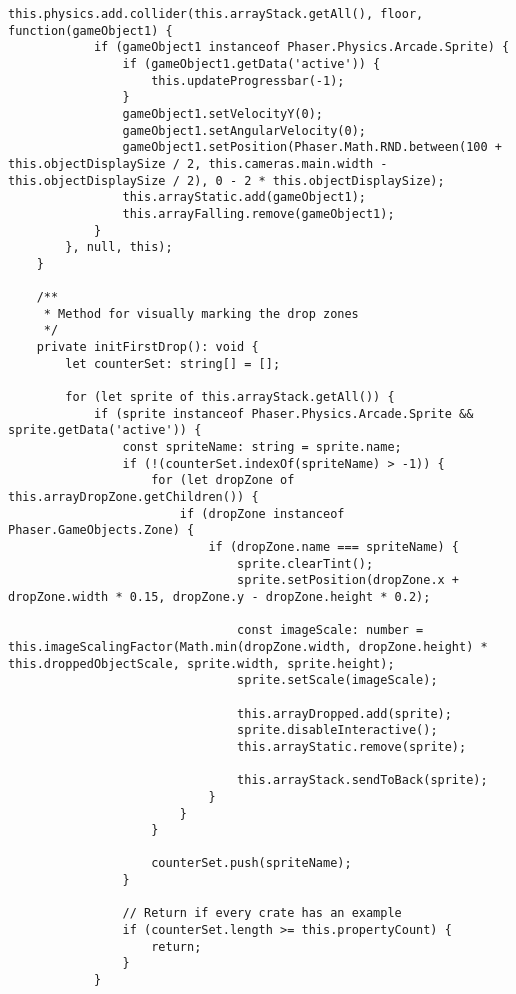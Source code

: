 \begin{lstlisting}[style=TypeScript, caption={propertySortingScene.ts}]
        this.physics.add.collider(this.arrayStack.getAll(), floor, function(gameObject1) {
            if (gameObject1 instanceof Phaser.Physics.Arcade.Sprite) {
                if (gameObject1.getData('active')) {
                    this.updateProgressbar(-1);
                }
                gameObject1.setVelocityY(0);
                gameObject1.setAngularVelocity(0);
                gameObject1.setPosition(Phaser.Math.RND.between(100 + this.objectDisplaySize / 2, this.cameras.main.width - this.objectDisplaySize / 2), 0 - 2 * this.objectDisplaySize);
                this.arrayStatic.add(gameObject1);
                this.arrayFalling.remove(gameObject1);
            }
        }, null, this);
    }

    /**
     * Method for visually marking the drop zones
     */
    private initFirstDrop(): void {
        let counterSet: string[] = [];

        for (let sprite of this.arrayStack.getAll()) {
            if (sprite instanceof Phaser.Physics.Arcade.Sprite && sprite.getData('active')) {
                const spriteName: string = sprite.name;
                if (!(counterSet.indexOf(spriteName) > -1)) {
                    for (let dropZone of this.arrayDropZone.getChildren()) {
                        if (dropZone instanceof Phaser.GameObjects.Zone) {
                            if (dropZone.name === spriteName) {
                                sprite.clearTint();
                                sprite.setPosition(dropZone.x + dropZone.width * 0.15, dropZone.y - dropZone.height * 0.2);

                                const imageScale: number = this.imageScalingFactor(Math.min(dropZone.width, dropZone.height) * this.droppedObjectScale, sprite.width, sprite.height);
                                sprite.setScale(imageScale);

                                this.arrayDropped.add(sprite);
                                sprite.disableInteractive();
                                this.arrayStatic.remove(sprite);

                                this.arrayStack.sendToBack(sprite);
                            }
                        }
                    }

                    counterSet.push(spriteName);
                }

                // Return if every crate has an example
                if (counterSet.length >= this.propertyCount) {
                    return;
                }
            }


\end{lstlisting}
